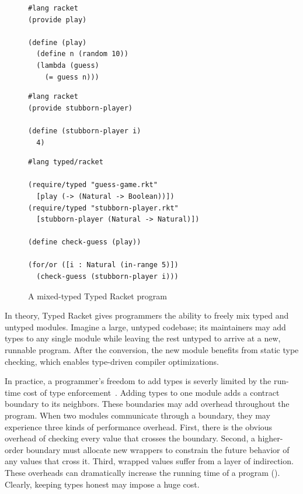 \begin{figure}[h]
  \begin{minipage}[t]{0.45\columnwidth}
    \begin{lstlisting}
#lang racket
(provide play)

(define (play)
  (define n (random 10))
  (lambda (guess)
    (= guess n)))
    \end{lstlisting}

  \end{minipage}\begin{minipage}[t]{0.45\columnwidth}
    \begin{lstlisting}
#lang racket
(provide stubborn-player)

(define (stubborn-player i)
  4)
    \end{lstlisting}

  \end{minipage}

  \smallskip
  \begin{centering}
    \begin{minipage}{0.6\columnwidth}
      \begin{lstlisting}
#lang typed/racket

(require/typed "guess-game.rkt"
  [play (-> (Natural -> Boolean))])
(require/typed "stubborn-player.rkt"
  [stubborn-player (Natural -> Natural)])

(define check-guess (play))

(for/or ([i : Natural (in-range 5)])
  (check-guess (stubborn-player i)))
      \end{lstlisting}
    \end{minipage}
  \end{centering}

  \caption{A mixed-typed Typed Racket program~\cite{gtnffvf-jfp-2019}}
  \label{fig:guess-game}
\end{figure}

In theory, Typed Racket gives programmers the ability to freely mix typed and untyped modules.
Imagine a large, untyped codebase;
 its maintainers may add types to any single module while leaving the rest
 untyped to arrive at a new, runnable program.
After the conversion, the new module benefits from static type checking,
 which enables type-driven compiler optimizations.

In practice, a programmer's freedom to add types is severly limited by
 the run-time cost of type enforcement~\cite{tfgnvf-popl-2016,gtnffvf-jfp-2019}.
Adding types to one module adds a contract boundary to its neighbors.
These boundaries may add overhead throughout the program.
When two modules communicate through a boundary, they may experience three kinds
 of performance overhead.
First, there is the obvious overhead of checking every value that crosses the
 boundary.
Second, a higher-order boundary must allocate new wrappers to constrain the
 future behavior of any values that cross it.
Third, wrapped values suffer from a layer of indirection.
These overheads can dramatically increase the running time of a program
 ().
Clearly, keeping types honest may impose a huge cost.

